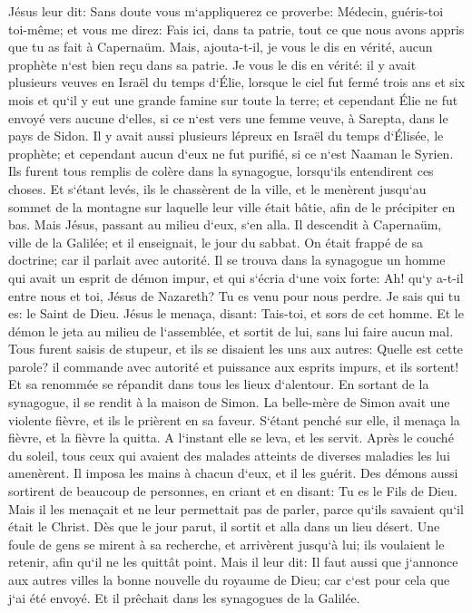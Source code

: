 \verse Jésus leur dit: Sans doute vous m`appliquerez ce proverbe: Médecin, guéris-toi toi-même; et vous me direz: Fais ici, dans ta patrie, tout ce que nous avons appris que tu as fait à Capernaüm. 
\verse Mais, ajouta-t-il, je vous le dis en vérité, aucun prophète n`est bien reçu dans sa patrie. 
\verse Je vous le dis en vérité: il y avait plusieurs veuves en Israël du temps d`Élie, lorsque le ciel fut fermé trois ans et six mois et qu`il y eut une grande famine sur toute la terre; 
\verse et cependant Élie ne fut envoyé vers aucune d`elles, si ce n`est vers une femme veuve, à Sarepta, dans le pays de Sidon. 
\verse Il y avait aussi plusieurs lépreux en Israël du temps d`Élisée, le prophète; et cependant aucun d`eux ne fut purifié, si ce n`est Naaman le Syrien. 
\verse Ils furent tous remplis de colère dans la synagogue, lorsqu`ils entendirent ces choses. 
\verse Et s`étant levés, ils le chassèrent de la ville, et le menèrent jusqu`au sommet de la montagne sur laquelle leur ville était bâtie, afin de le précipiter en bas. 
\verse Mais Jésus, passant au milieu d`eux, s`en alla. 
\verse Il descendit à Capernaüm, ville de la Galilée; et il enseignait, le jour du sabbat. 
\verse On était frappé de sa doctrine; car il parlait avec autorité. 
\verse Il se trouva dans la synagogue un homme qui avait un esprit de démon impur, et qui s`écria d`une voix forte: 
\verse Ah! qu`y a-t-il entre nous et toi, Jésus de Nazareth? Tu es venu pour nous perdre. Je sais qui tu es: le Saint de Dieu. 
\verse Jésus le menaça, disant: Tais-toi, et sors de cet homme. Et le démon le jeta au milieu de l`assemblée, et sortit de lui, sans lui faire aucun mal. 
\verse Tous furent saisis de stupeur, et ils se disaient les uns aux autres: Quelle est cette parole? il commande avec autorité et puissance aux esprits impurs, et ils sortent! 
\verse Et sa renommée se répandit dans tous les lieux d`alentour. 
\verse En sortant de la synagogue, il se rendit à la maison de Simon. La belle-mère de Simon avait une violente fièvre, et ils le prièrent en sa faveur. 
\verse S`étant penché sur elle, il menaça la fièvre, et la fièvre la quitta. A l`instant elle se leva, et les servit. 
\verse Après le couché du soleil, tous ceux qui avaient des malades atteints de diverses maladies les lui amenèrent. Il imposa les mains à chacun d`eux, et il les guérit. 
\verse Des démons aussi sortirent de beaucoup de personnes, en criant et en disant: Tu es le Fils de Dieu. Mais il les menaçait et ne leur permettait pas de parler, parce qu`ils savaient qu`il était le Christ. 
\verse Dès que le jour parut, il sortit et alla dans un lieu désert. Une foule de gens se mirent à sa recherche, et arrivèrent jusqu`à lui; ils voulaient le retenir, afin qu`il ne les quittât point. 
\verse Mais il leur dit: Il faut aussi que j`annonce aux autres villes la bonne nouvelle du royaume de Dieu; car c`est pour cela que j`ai été envoyé. 
\verse Et il prêchait dans les synagogues de la Galilée. 

